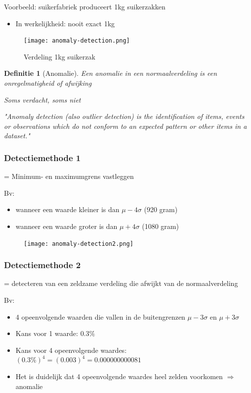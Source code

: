 \documentclass{article}
\newtheorem{theorem}{Definitie}[section]
\begin{document}
Voorbeeld: suikerfabriek produceert 1kg suikerzakken

\begin{itemize}
    \item In werkelijkheid: nooit exact 1kg
\end{itemize}

\begin{figure}[H]
    \centering
    \texttt{[image: anomaly-detection.png]}
    \caption{Verdeling 1kg suikerzak}
\end{figure}

\begin{theorem}[Anomalie]
    Een anomalie in een normaalverdeling is een onregelmatigheid of afwijking

    Soms verdacht, soms niet

    "Anomaly detection (also outlier detection) is the identification of items,
    events or observations which do not conform to an expected pattern or
    other items in a dataset."
\end{theorem}

\subsubsection{Detectiemethode 1}

= Minimum- en maximumgrens vastleggen

Bv:

\begin{itemize}
    \item wanneer een waarde kleiner is dan $\mu - 4\sigma$ (920 gram)
    \item wanneer een waarde groter is dan $\mu + 4\sigma$ (1080 gram)
\end{itemize}

\begin{figure}[H]
    \centering
    \texttt{[image: anomaly-detection2.png]}
\end{figure}

\subsubsection{Detectiemethode 2}

= detecteren van een zeldzame verdeling die afwijkt van de normaalverdeling

Bv:

\begin{itemize}
    \item 4 opeenvolgende waarden die vallen in de buitengrenzen $\mu - 3\sigma$ en $\mu + 3\sigma$
    \item Kans voor 1 waarde: $0.3\%$
    \item Kans voor 4 opeenvolgende waardes: $(0.3\%)^4 = (0.003)^4 = 0.000000000081$
    \item Het is duidelijk dat 4 opeenvolgende waardes heel zelden voorkomen $\Rightarrow$ anomalie
\end{itemize}
\end{document}
